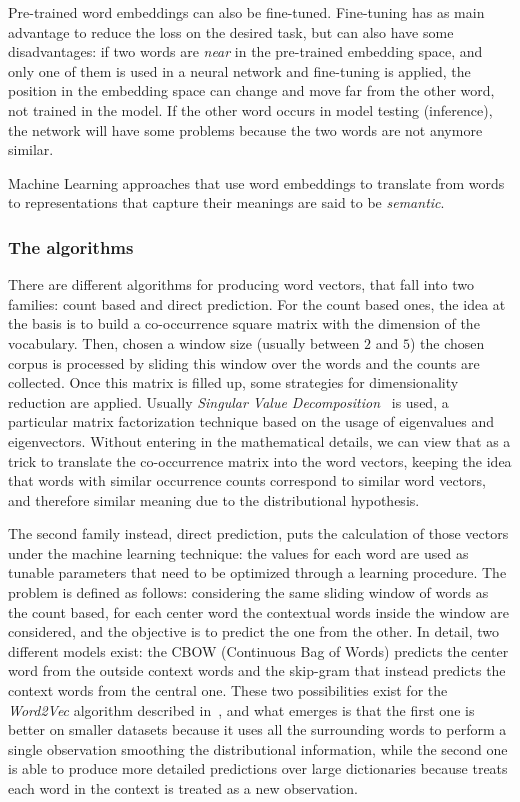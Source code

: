 Pre-trained word embeddings can also be fine-tuned. Fine-tuning has as main advantage to reduce the loss on the desired task, but can also have some disadvantages: if two words are \textit{near} in the pre-trained embedding space, and only one of them is used in a neural network and fine-tuning is applied, the position in the embedding space can change and move far from the other word, not trained in the model. If the other word occurs in model testing (inference), the network will have some problems because the two words are not anymore similar.

Machine Learning approaches that use word embeddings to translate from words to representations that capture their meanings are said to be \textit{semantic}.

\subsubsection{The algorithms}
There are different algorithms for producing word vectors, that fall into two families: count based and direct prediction. For the count based ones, the idea at the basis is to build a co-occurrence square matrix with the dimension of the vocabulary. Then, chosen a window size (usually between $2$ and $5$) the chosen corpus is processed by sliding this window over the words and the counts are collected. Once this matrix is filled up, some strategies for dimensionality reduction are applied. Usually \textit{Singular Value Decomposition}~\cite{golub1970singular} is used, a particular matrix factorization technique based on the usage of eigenvalues and eigenvectors. Without entering in the mathematical details, we can view that as a trick to translate the co-occurrence matrix into the word vectors, keeping the idea that words with similar occurrence counts correspond to similar word vectors, and therefore similar meaning due to the distributional hypothesis.

The second family instead, direct prediction, puts the calculation of those vectors under the machine learning technique: the values for each word are used as tunable parameters that need to be optimized through a learning procedure. The problem is defined as follows: considering the same sliding window of words as the count based, for each center word the contextual words inside the window are considered, and the objective is to predict the one from the other. In detail, two different models exist: the CBOW (Continuous Bag of Words) predicts the center word from the outside context words and the skip-gram that instead predicts the context words from the central one. These two possibilities exist for the \textit{Word2Vec }algorithm described in~\cite{mikolov2013efficient}, and what emerges is that the first one is better on smaller datasets because it uses all the surrounding words to perform a single observation smoothing the distributional information, while the second one is able to produce more detailed predictions over large dictionaries because treats each word in the context is treated as a new observation.

